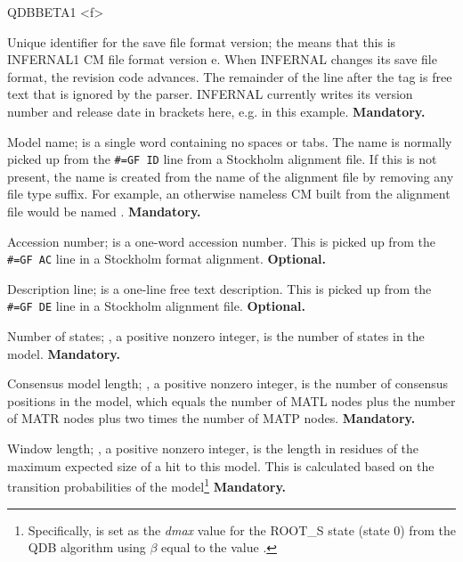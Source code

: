 \begin{sreitems}{QDBBETA1 <f>}

\item [\emprog{INFERNAL1/e}] Unique identifier for the save file format
  version; the  means that this is INFERNAL1 CM file format
  version e. When INFERNAL changes its save file format, the revision
  code advances. The remainder of the line after the  tag
  is free text that is ignored by the parser. INFERNAL currently writes
  its version number and release date in brackets here,
  e.g. \prog{[1.2 | January 2026]} in this
  example. \textbf{Mandatory.}

\item [\emprog{NAME <s>}] Model name;  is a single word
containing no spaces or tabs. The name is normally picked up from the
\verb+#=GF ID+ line from a Stockholm alignment file.  If this is not
present, the name is created from the name of the alignment file by
removing any file type suffix. For example, an otherwise nameless CM
built from the alignment file  would be named
.  \textbf{Mandatory.}

\item [\emprog{ACC <s>}] Accession number;  is a one-word
accession number. This is picked up from the \verb+#=GF AC+ line in a
Stockholm format alignment. \textbf{Optional.}

\item [\emprog{DESC <s>}] Description line;  is a one-line
free text description. This is picked up from the \verb+#=GF DE+ line
in a Stockholm alignment file. \textbf{Optional.}

\item [\emprog{STATES <d>}] Number of states; , a positive nonzero
integer, is the number of states in the model.
\textbf{Mandatory.}

\item [\emprog{CLEN <d>}] Consensus model length; , a positive nonzero
integer, is the number of consensus positions in the model, which
equals the number of MATL nodes plus the number of MATR nodes plus two
times the number of MATP nodes.
\textbf{Mandatory.}

\item [\emprog{W <d>}] Window length; , a positive nonzero
integer, is the length in residues of the maximum expected size of a
hit to this model. This is calculated based on the transition
probabilities of the model\footnote{Specifically,  is set as
the \emph{dmax} value for the ROOT\_S state (state 0) from the QDB
algorithm using $\beta$ equal to the  value
\citep{NawrockiEddy07}.}  \textbf{Mandatory.}


\end{sreitems}
